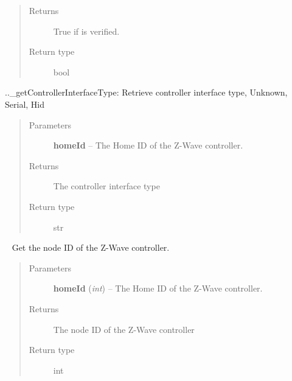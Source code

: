 \documentclass[letterpaper,10pt,english]{sphinxmanual}
\begin{document}
\begin{fulllineitems}
\begin{fulllineitems}
\begin{quote}
\begin{description}
\item[{Returns}] \leavevmode
True if is verified.

\item[{Return type}] \leavevmode
bool

\end{description}\end{quote}

\end{fulllineitems}


\begin{fulllineitems}
\label{libopenzwave:libopenzwave.PyManager.getControllerInterfaceType}
..\_getControllerInterfaceType:
Retrieve controller interface type, Unknown, Serial, Hid
\begin{quote}\begin{description}
\item[{Parameters}] \leavevmode
\textbf{homeId} -- The Home ID of the Z-Wave controller.

\item[{Returns}] \leavevmode
The controller interface type

\item[{Return type}] \leavevmode
str

\end{description}\end{quote}

\end{fulllineitems}


\begin{fulllineitems}
\label{libopenzwave:libopenzwave.PyManager.getControllerNodeId}~\label{libopenzwave:getcontrollernodeid}
Get the node ID of the Z-Wave controller.
\begin{quote}\begin{description}
\item[{Parameters}] \leavevmode
\textbf{homeId} (\emph{int}) -- The Home ID of the Z-Wave controller.

\item[{Returns}] \leavevmode
The node ID of the Z-Wave controller

\item[{Return type}] \leavevmode
int


\end{description}
\end{quote}
\end{fulllineitems}
\end{fulllineitems}
\end{document}
